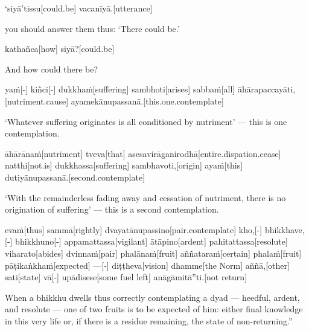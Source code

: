 \begin{samepage}
\begingl[glneveryline={\PaliGlossA,\PaliGlossB}]
‘siyā’tissu[could.be] vacanīyā.[utterance]
\endgl
\nopagebreak
\linespread{0.5}
\begin{spacin}{0.2}
{\PaliGlossFT you should answer them thus: ‘There could be.’}
\end{spacin}
\vskip 12pt
\end{samepage}
\begin{samepage}
\begingl[glneveryline={\PaliGlossA,\PaliGlossB}]
kathañca[how] siyā?[could.be]
\endgl
\nopagebreak
\linespread{0.5}
\begin{spacin}{0.2}
{\PaliGlossFT And how could there be?}
\end{spacin}
\vskip 12pt
\end{samepage}
\begin{samepage}
\begingl[glneveryline={\PaliGlossA,\PaliGlossB}]
yaṁ[-] kiñci[-] dukkhaṁ[suffering] sambhoti[arises] sabbaṁ[all] āhārapaccayāti,[nutriment.cause] ayamekānupassanā.[this.one.contemplate]
\endgl
\nopagebreak
\linespread{0.5}
\begin{spacin}{0.2}
{\PaliGlossFT ‘Whatever suffering originates is all conditioned by nutriment’ — this is one contemplation.}
\end{spacin}
\vskip 12pt
\end{samepage}
\begin{samepage}
\begingl[glneveryline={\PaliGlossA,\PaliGlossB}]
āhārānaṁ[nutriment] tveva[that] asesavirāganirodhā[entire.dispation.cease] natthi[not.is] dukkhassa[suffering] sambhavoti,[origin] ayaṁ[this] dutiyānupassanā.[second.contemplate]
\endgl
\nopagebreak
\linespread{0.5}
\begin{spacin}{0.2}
{\PaliGlossFT ‘With the remainderless fading away and cessation of nutriment, there is no origination of suffering’ — this is a second contemplation.}
\end{spacin}
\vskip 12pt
\end{samepage}
\begin{samepage}
\begingl[glneveryline={\PaliGlossA,\PaliGlossB}]
evaṁ[thus] sammā[rightly] dvayatānupassino[pair.contemplate] kho,[-] bhikkhave,[-] bhikkhuno[-] appamattassa[vigilant] ātāpino[ardent] pahitattassa[resolute] viharato[abides] dvinnaṁ[pair] phalānaṁ[fruit] aññataraṁ[certain] phalaṁ[fruit] pāṭikaṅkhaṁ[expected] —[-] diṭṭheva[vision] dhamme[the Norm] aññā,[other] sati[state] vā[-] upādisese[some fuel left] anāgāmitā”ti.[not return]
\endgl
\nopagebreak
\linespread{0.5}
\begin{spacin}{0.2}
{\PaliGlossFT When a bhikkhu dwells thus correctly contemplating a dyad — heedful, ardent, and resolute — one of two fruits is to be expected of him: either final knowledge in this very life or, if there is a residue remaining, the state of non-returning.”}
\end{spacin}
\vskip 12pt
\end{samepage}

